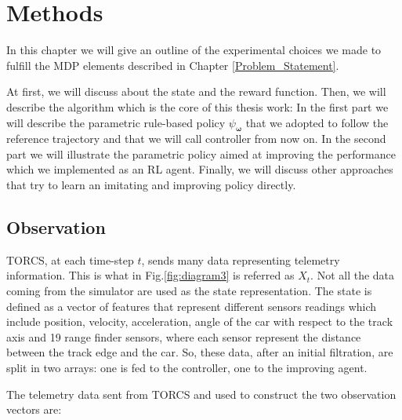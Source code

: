 \chapter{Methods}
\label{Methods}
\thispagestyle{empty}

In this chapter we will give an outline of the experimental choices we made to fulfill the MDP elements described in Chapter \ref{Problem_Statement}.

At first, we will discuss about the state and the reward function.
Then, we will describe the algorithm which is the core of this thesis work:
In the first part we will describe the parametric rule-based policy $\psi_{\boldsymbol \omega}$ that we adopted to follow the reference trajectory and that we will call controller from now on. In the second part we will illustrate the parametric policy aimed at improving the performance which we implemented as an RL agent.
Finally, we will discuss other approaches that try to learn an imitating and improving policy directly.

\section{Observation}
\label{sec:obs}

TORCS, at each time-step $t$, sends many data representing telemetry information. This is what in Fig.\ref{fig:diagram3} is referred as $X_t$.
Not all the data coming from the simulator are used as the state representation.
The state is defined as a vector of features that represent different sensors readings which include position, velocity, acceleration, angle of the car with respect to the track axis and 19 range finder sensors, where each sensor represent the distance between the track edge and the car.
So, these data, after an initial filtration, are split in two arrays: one is fed to the controller, one to the improving agent.

The telemetry data sent from TORCS and used to construct the two observation vectors are:

